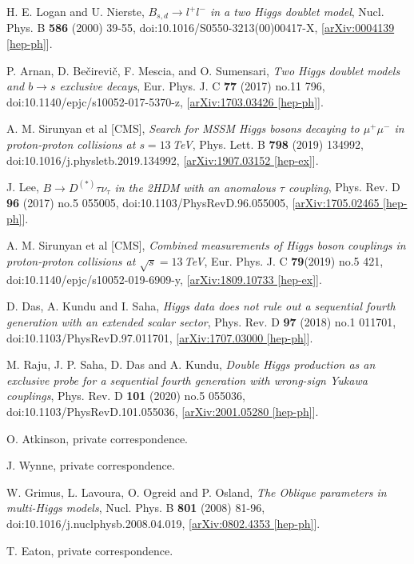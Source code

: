\documentclass[a4paper,12pt]{article}
\begin{document}
\begin{thebibliography}{99}
H. E. Logan and U. Nierste, \emph{$B_{s,d}\to l^+l^-$ in a two Higgs doublet model}, Nucl. Phys. B \textbf{586} (2000) 39-55, doi:10.1016/S0550-3213(00)00417-X, [\href{https://arxiv.org/abs/hep-ph/0004139}{arXiv:0004139 [hep-ph]}].

P. Arnan, D. Be\v{c}irevi\v{c}, F. Mescia, and O. Sumensari, \emph{Two Higgs doublet models and $b\to s$ exclusive decays}, Eur. Phys. J. C \textbf{77} (2017) no.11 796, doi:10.1140/epjc/s10052-017-5370-z, [\href{https://arxiv.org/abs/1703.03426}{arXiv:1703.03426 [hep-ph]}].

A. M. Sirunyan et al [CMS], \emph{Search for MSSM Higgs bosons decaying to $\mu^+\mu^-$ in proton-proton collisions at $s=13\,$TeV}, Phys. Lett. B \textbf{798} (2019) 134992, doi:10.1016/j.physletb.2019.134992, [\href{https://arxiv.org/abs/1907.03152}{arXiv:1907.03152 [hep-ex]}].

J. Lee, \emph{$B\to D^{(*)}\tau\nu_\tau$ in the 2HDM with an anomalous $\tau$ coupling}, Phys. Rev. D \textbf{96} (2017) no.5 055005, doi:10.1103/PhysRevD.96.055005, [\href{https://arxiv.org/abs/1705.02465}{arXiv:1705.02465 [hep-ph]}].

A. M. Sirunyan et al [CMS], \emph{Combined measurements of Higgs boson couplings in proton-proton collisions at $\sqrt{s}=13\,$TeV}, Eur. Phys. J. C \textbf{79}(2019) no.5 421, doi:10.1140/epjc/s10052-019-6909-y, [\href{https://arxiv.org/abs/1809.10733}{arXiv:1809.10733 [hep-ex]}].

D. Das, A. Kundu and I. Saha, \emph{Higgs data does not rule out a sequential fourth generation with an extended scalar sector}, Phys. Rev. D \textbf{97} (2018) no.1 011701, doi:10.1103/PhysRevD.97.011701, [\href{https://arxiv.org/abs/1707.03000}{arXiv:1707.03000 [hep-ph]}].

M. Raju, J. P. Saha, D. Das and A. Kundu, \emph{Double Higgs production as an exclusive probe for a sequential fourth generation with wrong-sign Yukawa couplings}, Phys. Rev. D \textbf{101} (2020) no.5 055036, doi:10.1103/PhysRevD.101.055036, [\href{https://arxiv.org/abs/2001.05280}{arXiv:2001.05280 [hep-ph]}].

O. Atkinson, private correspondence.

J. Wynne, private correspondence.

W. Grimus, L. Lavoura, O. Ogreid and P. Osland, \emph{The Oblique parameters in multi-Higgs models}, Nucl. Phys. B \textbf{801} (2008) 81-96, doi:10.1016/j.nuclphysb.2008.04.019, [\href{https://arxiv.org/abs/0802.4353}{arXiv:0802.4353 [hep-ph]}].

T. Eaton, private correspondence.

\end{thebibliography}
\end{document}

